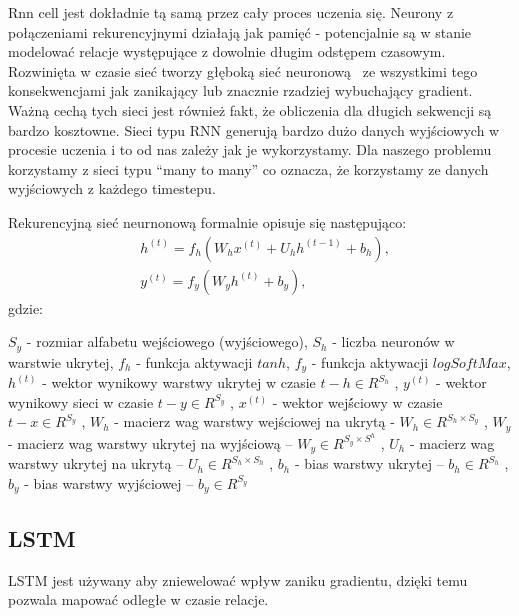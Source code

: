 Rnn cell jest dokładnie tą samą przez cały proces
uczenia się. Neurony z połączeniami rekurencyjnymi działają jak pamięć - potencjalnie są w stanie modelować relacje
występujące z dowolnie długim odstępem czasowym. 
Rozwinięta w czasie sieć tworzy głęboką sieć neuronową 
ze wszystkimi tego konsekwencjami jak zanikający lub znacznie rzadziej wybuchający gradient. 
Ważną cechą tych sieci jest również fakt, że obliczenia dla długich sekwencji są bardzo kosztowne.
Sieci typu RNN generują bardzo dużo danych wyjściowych w procesie uczenia i to od nas zależy jak je 
wykorzystamy. Dla naszego problemu korzystamy z sieci typu ``many to many'' co oznacza, że korzystamy
ze danych wyjściowych z każdego timestepu.

\newpage
Rekurencyjną sieć neurnonową formalnie opisuje się następująco:
\begin{align*}
  &h^{(t)} = f_h(W_hx^{(t)} + U_hh^{(t−1)} + b_h), \\
  &y^{(t)} = f_y(W_yh^{(t)} + b_y),
\end{align*}
gdzie:

$S_y$ - rozmiar alfabetu wejściowego (wyjściowego), \newline
$S_h$ - liczba neuronów w warstwie ukrytej, \newline
$f_h$ - funkcja aktywacji $tanh$, \newline
$f_y$ - funkcja aktywacji $logSoftMax$, \newline
$h^{(t)}$ - wektor wynikowy warstwy ukrytej w czasie $t - h \in R^{S_h}$ , \newline
$y^{(t)}$ - wektor wynikowy sieci w czasie $t - y \in R^{S_y}$ , \newline
$x^{(t)}$ - wektor wejś́ciowy w czasie $t - x \in R^{S_y}$ ,\newline
$W_h$ - macierz wag warstwy wejściowej na ukrytą - $W_h \in R^{{S_h}\times{S_y}}$ , \newline
$W_y$ - macierz wag warstwy ukrytej na wyjściową – $W_y \in R^{{S_y} \times S^h}$ , \newline
$U_h$ - macierz wag warstwy ukrytej na ukrytą  – $U_h \in R^{{S_h} \times S_h}$ ,\newline
$b_h$ - bias warstwy ukrytej – $b_h \in R^{S_h}$ , \newline
$b_y$ - bias warstwy wyjściowej – $b_y \in R^{S_y}$ \newline


\subsection{LSTM} 
LSTM jest używany aby zniewelować wpływ zaniku gradientu, dzięki temu pozwala mapować odległe w czasie relacje.

